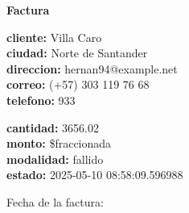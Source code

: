 \documentclass{article}
\begin{document}
\begin{center}
    {\LARGE \textbf{Factura}}\\[1cm]
\end{center}

\textbf{cliente:} Villa Caro \\
\textbf{ciudad:} Norte de Santander \\
\textbf{direccion:} hernan94@example.net \\
\textbf{correo:} (+57) 303 119 76 68 \\
\textbf{telefono:} 933 \\

\vspace{0.5cm}

\textbf{cantidad:} 3656.02 \\
\textbf{monto:} \$fraccionada \\
\textbf{modalidad:} fallido \\
\textbf{estado:} 2025-05-10 08:58:09.596988 \\

\vspace{1cm}

Fecha de la factura: 
\end{document}
